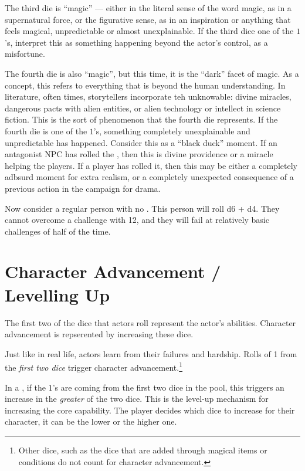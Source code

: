The third die is ``magic'' --- either in the literal sense of the word magic, as in a supernatural force,
or the figurative sense, as in an inspiration or anything that feels magical, unpredictable or almost unexplainable.
If the third dice one of the $1$'s, interpret this as something happening beyond the actor's control, as a misfortune.

The fourth die is also ``magic'', but this time, it is the ``dark'' facet of magic.
As a concept, this refers to everything that is beyond the human understanding.
In literature, often times, storytellers incorporate teh unknowable: divine miracles, dangerous pacts with alien entities, or alien technology or intellect in science fiction.
This is the sort of phenomenon that the fourth die represents.
If the fourth die is one of the $1$'s, something completely unexplainable and unpredictable has happened.
Consider this as a ``black duck'' moment.
If an antagonist NPC has rolled the , then this is divine providence or a miracle helping the players.
If a player has rolled it, then this may be either a completely adbsurd moment for extra realism, or a completely unexpected consequence of a previous action in the campaign for drama.


Now consider a regular person with no . This person will roll d6 + d4.
They cannot overcome a challenge with 12,
and they will fail at relatively basic challenges of  half of the time.

\section{Character Advancement / Levelling Up}

\label{subsec:character_advancement}

The first two of the dice that actors roll represent the actor's abilities.
Character advancement is repserented by increasing these dice.

Just like in real life, actors learn from their failures and hardship.
Rolls of 1 from the \emph{first two dice} trigger character advancement.\footnote{Other dice, such as the dice that are added through magical items or conditions do not count for character advancement.}

In a , if the $1$'s are coming from the first two dice in the pool, this
triggers an increase in the \emph{greater} of the two dice. This is the level-up mechanism
for increasing the core capability. The player decides which dice to increase for their
character, it can be the lower or the higher one.

